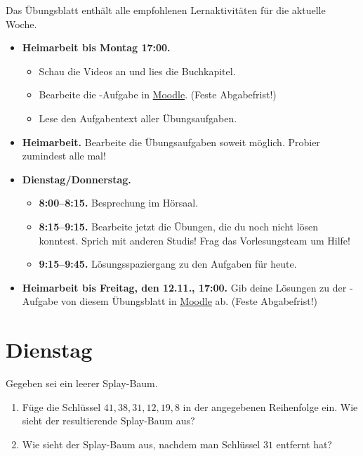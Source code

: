 \documentclass{uebung_cs}
\begin{document}
Das Übungsblatt enthält alle empfohlenen Lernaktivitäten für die aktuelle Woche.

\begin{itemize}
\item \textbf{Heimarbeit bis Montag 17:00.}
    \begin{itemize}
    \item 
    Schau die Videos an und lies die Buchkapitel.
    \item Bearbeite die -Aufgabe in \href{https://moodle.studiumdigitale.uni-frankfurt.de/moodle/course/view.php?id=2241}{Moodle}. (Feste Abgabefrist!)
    \item Lese den Aufgabentext aller Übungsaufgaben.
    \end{itemize}
\item \textbf{Heimarbeit.} Bearbeite die Übungsaufgaben soweit möglich. Probier zumindest alle mal!
\item \textbf{Dienstag/Donnerstag.}
\begin{itemize}
    \item \textbf{8:00--8:15.} Besprechung im Hörsaal.
    \item \textbf{8:15--9:15.} Bearbeite jetzt die Übungen, die du noch nicht lösen konntest. Sprich mit anderen Studis! Frag das Vorlesungsteam um Hilfe!
    \item \textbf{9:15--9:45.} Lösungsspaziergang zu den Aufgaben für heute.
\end{itemize}

\item \textbf{Heimarbeit bis Freitag, den 12.11., 17:00.} Gib deine Lösungen zu der -Aufgabe von diesem Übungsblatt in \href{https://moodle.studiumdigitale.uni-frankfurt.de/moodle/course/view.php?id=2241}{Moodle} ab. (Feste Abgabefrist!)
\end{itemize}

\section*{Dienstag}

\begin{aufgabe}
	Gegeben sei ein leerer Splay-Baum.
	\begin{enumerate}
		\item Füge die Schlüssel $41,38,31,12,19,8$ in der angegebenen Reihenfolge ein. Wie sieht der resultierende Splay-Baum aus?
		\item Wie sieht der Splay-Baum aus, nachdem man Schlüssel $31$ entfernt hat?
	\end{enumerate}		
\end{aufgabe}
\end{document}
